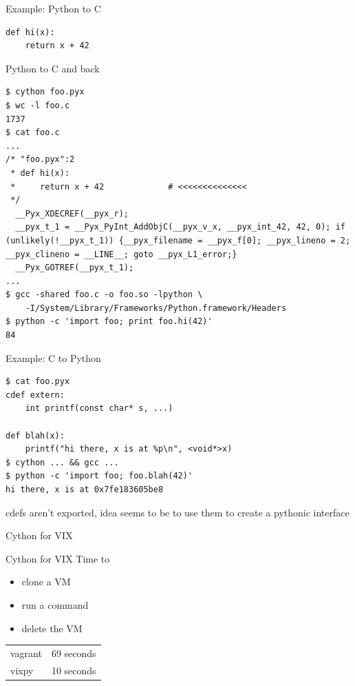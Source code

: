 \documentclass[xcolor=svgnames,17pt]{beamer}
\newcommand*{\sizefont}[1]{%
    \ifcase#1\relax
    \or \tiny
    \or \scriptsize
    \or \footnotesize
    \or \small
    \or \normalsize
    \or \large
    \or \Large
    \or \LARGE
    \or \huge
    \or \Huge
    \fi}
\begin{document}
\begin{frame}[fragile]{Example: Python to C}

\begin{verbatim}
def hi(x):
    return x + 42
\end{verbatim}

\end{frame}

\begin{frame}[fragile]{Python to C and back}

\sizefont 2
\begin{verbatim}
$ cython foo.pyx
$ wc -l foo.c
1737
$ cat foo.c
...
/* "foo.pyx":2
 * def hi(x):
 *     return x + 42             # <<<<<<<<<<<<<<
 */
  __Pyx_XDECREF(__pyx_r);
  __pyx_t_1 = __Pyx_PyInt_AddObjC(__pyx_v_x, __pyx_int_42, 42, 0); if (unlikely(!__pyx_t_1)) {__pyx_filename = __pyx_f[0]; __pyx_lineno = 2; __pyx_clineno = __LINE__; goto __pyx_L1_error;}
  __Pyx_GOTREF(__pyx_t_1);
...
$ gcc -shared foo.c -o foo.so -lpython \
    -I/System/Library/Frameworks/Python.framework/Headers
$ python -c 'import foo; print foo.hi(42)'
84
\end{verbatim}

\end{frame}

\begin{frame}[fragile]{Example: C to Python}
\sizefont 3
\begin{verbatim}
$ cat foo.pyx
cdef extern:
    int printf(const char* s, ...)

def blah(x):
    printf("hi there, x is at %p\n", <void*>x)
$ cython ... && gcc ...
$ python -c 'import foo; foo.blah(42)'
hi there, x is at 0x7fe183605be8
\end{verbatim}

\pause
\normalsize

cdefs aren’t exported, idea seems to be to use them to create a pythonic
interface
\end{frame}

\begin{frame}{Cython for VIX}
 \\
\pause
\centering
\vspace*{1.5\baselineskip}
\href{https://github.com/andrewdotn/vixpy}{}
\end{frame}

\begin{frame}{Cython for VIX}
Time to
\begin{itemize}
\item clone a VM
\item run a command
\item delete the VM
\end{itemize}

\vspace\baselineskip

\begin{tabular}{lr}
vagrant & 69 seconds \\
\pause
vixpy & 10 seconds
\end{tabular}

\end{frame}
\end{document}
